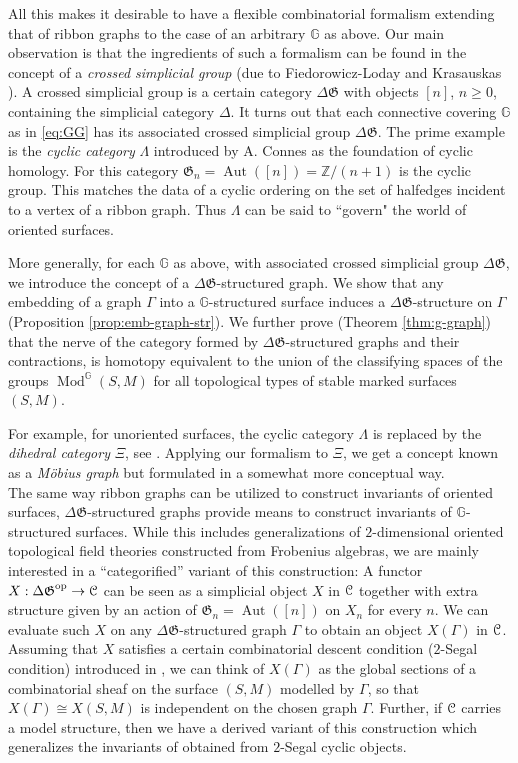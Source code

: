 \documentclass[english,11pt,leqno]{article}
\def\GG{\mathbb{G}}
\def\ZZ{\mathbb{Z}}
\def\Gen{\mathfrak{G}}
\def\Aut{\operatorname{Aut}\nolimits}
\def\Mod{\operatorname{Mod}}
\def\op{{\operatorname{op}}}
\def\C{{\EuScript C}}
\def\DG{ {\Delta \Gen}}
\theoremstyle{definition}
\theoremstyle{remark}
\numberwithin{equation}{section}
\begin{document}
All this makes it desirable to have a flexible combinatorial formalism extending that of ribbon
graphs to the case of an arbitrary $\GG$ as above.  Our main observation is that the ingredients of
such a formalism can be found in the concept of a {\em crossed simplicial group} (due to
Fiedorowicz-Loday \cite{fiedorowicz-loday} and Krasauskas \cite{krasauskas}). A crossed simplicial
group is a certain category $\Delta\Gen$ with objects $[n]$, $n\geq 0$, containing the simplicial
category $\Delta$. It turns out that each connective covering $\GG$ as in \eqref{eq:GG} has its
associated crossed simplicial group $\Delta\Gen$. The prime example is the {\em cyclic category}
$\Lambda$ introduced by A. Connes \cite{connes} as the foundation of cyclic homology. For this
category $\Gen_n = \Aut([n]) = \ZZ/(n+1)$ is the cyclic group. This matches the data of a cyclic ordering on the
set of halfedges incident to a vertex of a ribbon graph. Thus $\Lambda$ can be said to ``govern"
the world of oriented surfaces. 

More generally, for each $\GG$ as above, with associated crossed simplicial group $\Delta\Gen$, we
introduce the concept of a $\Delta\Gen$-structured graph. We show that any embedding of a graph
$\Gamma$ into a $\GG$-structured surface induces a $\DG$-structure on $\Gamma$ (Proposition
\ref{prop:emb-graph-str}).
We further prove (Theorem \ref{thm:g-graph}) that the nerve of the category formed by
$\DG$-structured graphs and their contractions, is homotopy equivalent to the union of the
classifying spaces of the groups $\Mod^\GG(S,M)$ for all topological types of stable marked surfaces
$(S,M)$. 

For example, for unoriented surfaces, the cyclic category $\Lambda$ is replaced by the {\em dihedral
category} $\Xi$, see \cite{loday}. Applying our formalism to $\Xi$, we get a concept known as a {\em
M\"obius graph} \cite {braun, mulase-waldron, mulase-yu} but formulated in a somewhat more
conceptual way.\\

The same way ribbon graphs can be utilized to construct invariants of oriented surfaces,
$\DG$-structured graphs provide means to construct invariants of $\GG$-structured surfaces. While this
includes generalizations of $2$-dimensional oriented topological field theories constructed from
Frobenius algebras, we are mainly interested in a ``categorified'' variant of this construction:
A functor $X:\DG^{\op} \to \C$ can be seen as a simplicial object $X$ in $\C$ together with extra structure
given by an action of $\Gen_n = \Aut([n])$ on $X_n$ for every $n$. 
We can evaluate such $X$ on any $\DG$-structured graph $\Gamma$ to obtain an object $X(\Gamma)$ in $\C$. Assuming that $X$
satisfies a certain combinatorial descent condition ($2$-Segal condition) introduced in
\cite{HSS1}, we can think of $X(\Gamma)$ as the global sections of a combinatorial sheaf on the
surface $(S,M)$ modelled by $\Gamma$, so that $X(\Gamma) \cong X(S,M)$ is independent on the chosen
graph $\Gamma$. Further, if $\C$ carries a model structure, then we have a derived
variant of this construction which generalizes the invariants of \cite{HSS-triangulated} obtained
from $2$-Segal cyclic objects.
\end{document}
